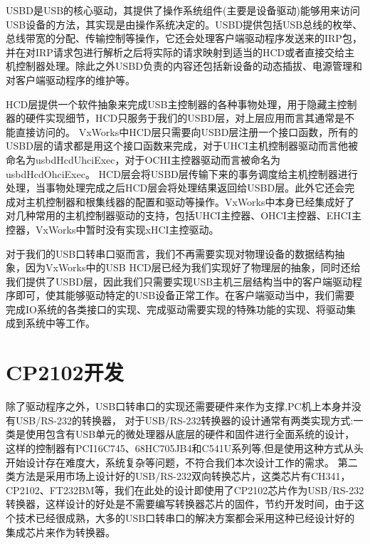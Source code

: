 	USBD是USB的核心驱动，其提供了操作系统组件(主要是设备驱动)能够用来访问USB设备的方法，其实现是由操作系统决定的。USBD提供包括USB总线的枚举、总线带宽的分配、传输控制等操作，它还会处理客户端驱动程序发送来的IRP包，并在对IRP请求包进行解析之后将实际的请求映射到适当的HCD或者直接交给主机控制器处理。除此之外USBD负责的内容还包括新设备的动态插拔、电源管理和对客户端驱动程序的维护等。
	
	HCD层提供一个软件抽象来完成USB主控制器的各种事物处理，用于隐藏主控制器的硬件实现细节，HCD只服务于我们的USBD层，对上层应用而言其通常是不能直接访问的。
	VxWorks中HCD层只需要向USBD层注册一个接口函数，所有的USBD层的请求都是用这个接口函数来完成，对于UHCI主机控制器驱动而言他被命名为usbdHcdUhciExec，对于OCHI主控器驱动而言被命名为usbdHcdOhciExec。
	HCD层会将USBD层传输下来的事务调度给主机控制器进行处理，当事物处理完成之后HCD层会将处理结果返回给USBD层。此外它还会完成对主机控制器和根集线器的配置和驱动等操作\cite{李雪红2004USB}。VxWorks中本身已经集成好了对几种常用的主机控制器驱动的支持，包括UHCI主控器、OHCI主控器、EHCI主控器，VxWorks中暂时没有实现xHCI主控驱动。
	
	对于我们的USB口转串口驱而言，我们不再需要实现对物理设备的数据结构抽象，因为VxWorks中的USB HCD层已经为我们实现好了物理层的抽象，同时还给我们提供了USBD层，因此我们只需要实现USB主机三层结构当中的客户端驱动程序即可，使其能够驱动特定的USB设备正常工作。在客户端驱动当中，我们需要完成IO系统的各类接口的实现、完成驱动需要实现的特殊功能的实现、将驱动集成到系统中等工作。
	


\section{CP2102开发}
	除了驱动程序之外，USB口转串口的实现还需要硬件来作为支撑,PC机上本身并没有USB/RS-232的转换器，
	对于USB/RS-232转换器的设计通常有两类实现方式:一类是使用包含有USB单元的微处理器从底层的硬件和固件进行全面系统的设计，这样的控制器有PCI16C745、68HC705JB4和C541U系列等\cite{USB与RS232接口转换器的设计},但是使用这种方式从头开始设计存在难度大，系统复杂等问题，不符合我们本次设计工作的需求。
	第二类方法是采用市场上设计好的USB/RS-232双向转换芯片，这类芯片有CH341，CP2102、FT232BM等，我们在此处的设计即使用了CP2102芯片作为USB/RS-232转换器，这样设计的好处是不需要编写转换器芯片的固件，节约开发时间，由于这个技术已经很成熟，大多的USB口转串口的解决方案都会采用这种已经设计好的集成芯片来作为转换器。
	
